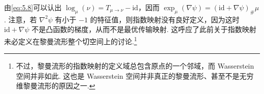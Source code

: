 由\eqref{eq:5.8}可以认出 $\log_\mu(\nu)=T_{\mu\to\nu}-\mathrm{id}$，因而 $\exp_\mu(\nabla\psi)=(\mathrm{id}+\nabla\psi)_\#\mu$. 注意，若 $\nabla^2\psi$ 有小于 $-1$ 的特征值，则指数映射没有良好定义，因为这时 $\mathrm{id}+\nabla\psi$ 不是凸函数的梯度，从而不是最优传输映射. 这呼应了此前关于指数映射未必定义在黎曼流形整个切空间上的讨论.\footnote{不过，黎曼流形的指数映射的定义域总包含原点的一个邻域，而 Wasserstein 空间并非如此. 这也是 Wasserstein 空间并非真正的黎曼流形、甚至不是无穷维黎曼流形的原因之一.}
